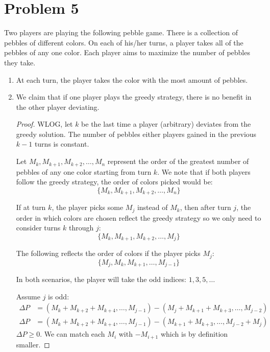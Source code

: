 \documentclass[12pt]{article}
\begin{document}
\section*{Problem 5}
Two players are playing the following pebble game. There is a collection of pebbles of different colors. On each of his/her turns, a player takes all of the pebbles of any one color. Each player aims to maximize the number of pebbles they take.
\begin{enumerate}
\item[(a)] At each turn, the player takes the color with the most amount of pebbles.

\item[(b)] We claim that if one player plays the greedy strategy, there is no benefit in the other player deviating. 

\begin{proof}
  WLOG, let $k$ be the last time a player (arbitrary) deviates from the greedy solution. The number of pebbles either players gained in the previous $k-1$ turns is constant. 

  Let $M_k, M_{k+1}, M_{k+2}, \dots, M_n$ represent the order of the greatest number of pebbles of any one color starting from turn $k$. We note that if both players follow the greedy strategy, the order of colors picked would be:
  \begin{equation}
    \{M_k, M_{k+1}, M_{k+2}, \dots, M_{n}\}
  \end{equation}

  If at turn $k$, the player picks some $M_j$ instead of $M_k$, then after turn $j$, the order in which colors are chosen reflect the greedy strategy so we only need to consider turns $k$ through $j$:
  \begin{equation}
    \{M_k, M_{k+1}, M_{k+2}, \dots, M_{j}\}
  \end{equation}
  
  The following reflects the order of colors if the player picks $M_j$:
  \begin{equation}
    \{M_j, M_k, M_{k+1}, \dots, M_{j-1}\}
  \end{equation}
  
  In both scenarios, the player will take the odd indices: $1, 3, 5, \dots$
  
  Assume $j$ is odd:
  \begin{align}
    \Delta P &= (M_k + M_{k+2} + M_{k+4}, \dots, M_{j-1}) - (M_j + M_{k+1} + M_{k+3}, \dots, M_{j-2}) \\
    \Delta P &= (M_k + M_{k+2} + M_{k+4}, \dots, M_{j-1}) - (M_{k+1} + M_{k+3}, \dots, M_{j-2} + M_j)
  \end{align}
  $\Delta P \geq 0$. We can match each $M_i$ with $- M_{i+1}$ which is by definition smaller. 


\end{proof}
\end{enumerate}
\end{document}

